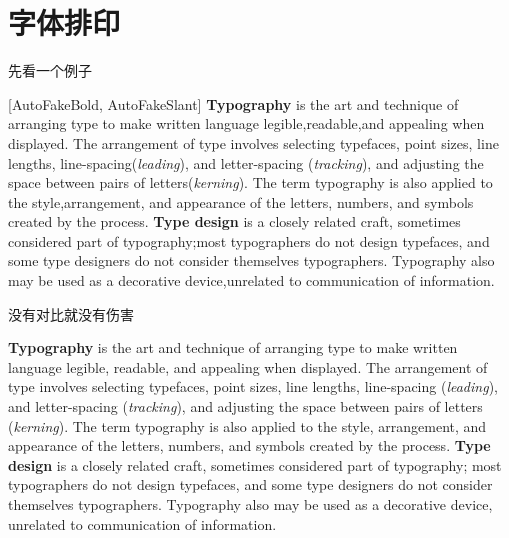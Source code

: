 \section{字体排印}

\begin{frame}{先看一个例子}
\begin{minipage}{\textwidth}
  [AutoFakeBold, AutoFakeSlant]\small
  \linespread{0.85}\selectfont
  \textbf{Typography} is the art and technique of arranging type to make written language
  legible,readable,and appealing when displayed. The arrangement of type involves selecting
  typefaces, point sizes, line lengths, line-spacing(\textit{leading}), and letter-spacing
  (\textit{tracking}), and adjusting the space between pairs of letters(\textit{kerning}).
  The term typography is also applied to the style,arrangement, and appearance of the letters,
  numbers, and symbols created by the process. \textbf{Type design} is a closely related craft,
  sometimes considered part of typography;most typographers do not design typefaces, and some
  type designers do not consider themselves typographers. Typography also may be used as a
  decorative device,unrelated to communication of information.
\end{minipage}
\end{frame}

\begin{frame}{没有对比就没有伤害}
\begin{minipage}{\textwidth}
  \small
  \textbf{Typography} is the art and technique of arranging type to make written language
  legible, readable, and appealing when displayed. The arrangement of type involves selecting
  typefaces, point sizes, line lengths, line-spacing (\textit{leading}), and letter-spacing
  (\textit{tracking}), and adjusting the space between pairs of letters (\textit{kerning}).
  The term typography is also applied to the style, arrangement, and appearance of the letters,
  numbers, and symbols created by the process. \textbf{Type design} is a closely related craft,
  sometimes considered part of typography; most typographers do not design typefaces, and some
  type designers do not consider themselves typographers. Typography also may be used as a
  decorative device, unrelated to communication of information.
\end{minipage}
\end{frame}

